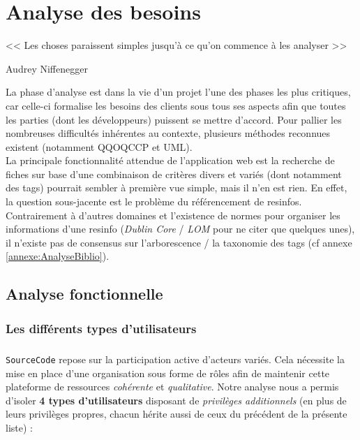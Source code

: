 \chapter{Analyse des besoins}
\label{chapter:analyseDesBesoins}

\epigraph{<< Les choses paraissent simples jusqu'à ce qu'on commence à les analyser >>}{Audrey Niffenegger}

La phase d'analyse est dans la vie d'un projet l'une des phases les plus critiques, car celle-ci formalise les besoins des clients sous tous ses aspects afin que toutes les parties (dont les développeurs) puissent se mettre d'accord. Pour pallier les nombreuses difficultés inhérentes au contexte, plusieurs méthodes reconnues existent (notamment \Gls{QQOQCCP} et UML). \\

La principale fonctionnalité attendue de l'application web est la recherche de \glspl{fiche} sur base d'une combinaison de critères divers et variés (dont notamment des \glspl{tag}) pourrait sembler à première vue simple, mais il n'en est rien. En effet, la question sous-jacente est le problème du référencement de \glspl{resinfo}. Contrairement à d'autres domaines et l'existence de normes pour organiser les informations d'une \gls{resinfo} (\textit{Dublin Core} / \textit{LOM} pour ne citer que quelques unes), il n'existe pas de consensus sur l'arborescence / la taxonomie des \glspl{tag} (cf annexe \ref{annexe:AnalyseBiblio}).

\section{Analyse fonctionnelle}
\label{section:analyseFonctionnelle}

\subsection*{Les différents types d'utilisateurs}



\paragraph{} \texttt{SourceCode} repose sur la participation active d'acteurs variés. Cela nécessite la mise en place d'une organisation sous forme de rôles afin de maintenir cette plateforme de ressources \textit{cohérente} et \textit{qualitative}. Notre analyse nous a permis d'isoler \textbf{4 types d'utilisateurs} disposant de \textit{privilèges additionnels} (en plus de leurs privilèges propres, chacun hérite aussi de ceux du précédent de la présente liste) :

